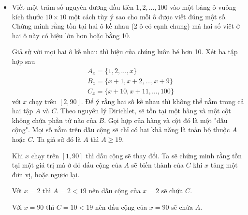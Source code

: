 \documentclass[11pt]{scrartcl}
\begin{document}
\begin{itemize}[label=, leftmargin=0em, itemsep=0.5em]
\begin{sol}
    \end{sol}
    \item \begin{bt}
        Viết một trăm số nguyên dương đầu tiên $1,2,\dots,100$ vào một bảng ô vuông kích thước $10\times 10$ một cách tùy ý sao cho mỗi ô được viết đúng một số. Chứng minh rằng tồn tại hai ô kề nhau (2 ô có cạnh chung) mà hai số viêt ở hai ô này có hiệu lớn hơn hoặc bằng 10.
    \end{bt}
    \begin{sol}
        Giả sử với mọi hai ô kề nhau thì hiệu của chúng luôn bé hơn 10. Xét ba tập hợp sau 
        \[
            \begin{aligned}
                &A_x = \{1,2,\dots,x\}\\
                &B_x = \{x + 1, x+ 2,\dots,x +9\}\\
                &C_x = \{x + 10, x + 11,\dots, 100\}
            \end{aligned}
        \]
        với $x$ chạy trên $[2,90]$. Để ý rằng hai số kề nhau thì không thể nằm trong cả hai tập $A$ và $C$. Theo nguyên lý Dirichlet, sẽ tồn tại một hàng và một cột không chứa phần tử nào của $B$. Gọi hợp của hàng và cột đó là một "dấu cộng". Mọi số nằm trên dấu cộng sẽ chỉ có hai khả năng là toàn bộ thuộc $A$ hoặc $C$. Ta giả sử đó là $A$ thì $A \geq 19$. 

        Khi $x$ chạy trên $[1,90]$ thì dấu cộng sẽ thay đổi. Ta sẽ chứng minh rằng tồn tại một giá trị mà ở đó dấu cộng của $A$ sẽ biến thành của $C$ khi $x$ tăng một đơn vị, hoặc ngược lại. 
        
        Với $x = 2$ thì $A = 2 < 19$ nên dấu cộng của $x = 2$ sẽ chứa $C$. 

        Với $x = 90$ thì $C = 10 < 19$ nên dấu cộng của $x = 90$ sẽ chứa $A$.


\end{sol}
\end{itemize}
\end{document}
